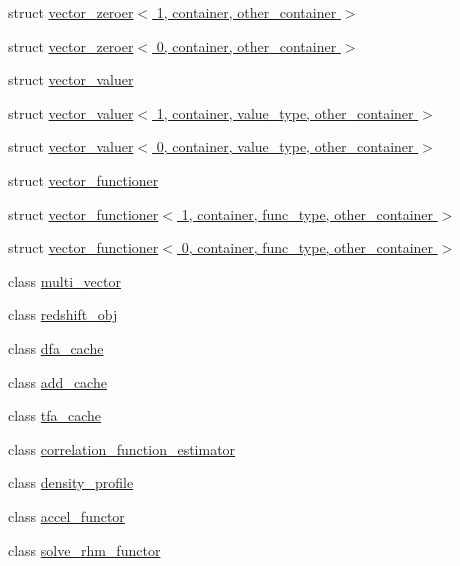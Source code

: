 \begin{DoxyCompactItemize}
struct \hyperlink{structIceBRG_1_1vector__zeroer_3_011_00_01container_00_01other__container_01_4}{vector\-\_\-zeroer$<$ 1, container, other\-\_\-container $>$}
\item 
struct \hyperlink{structIceBRG_1_1vector__zeroer_3_010_00_01container_00_01other__container_01_4}{vector\-\_\-zeroer$<$ 0, container, other\-\_\-container $>$}
\item 
struct \hyperlink{structIceBRG_1_1vector__valuer}{vector\-\_\-valuer}
\item 
struct \hyperlink{structIceBRG_1_1vector__valuer_3_011_00_01container_00_01value__type_00_01other__container_01_4}{vector\-\_\-valuer$<$ 1, container, value\-\_\-type, other\-\_\-container $>$}
\item 
struct \hyperlink{structIceBRG_1_1vector__valuer_3_010_00_01container_00_01value__type_00_01other__container_01_4}{vector\-\_\-valuer$<$ 0, container, value\-\_\-type, other\-\_\-container $>$}
\item 
struct \hyperlink{structIceBRG_1_1vector__functioner}{vector\-\_\-functioner}
\item 
struct \hyperlink{structIceBRG_1_1vector__functioner_3_011_00_01container_00_01func__type_00_01other__container_01_4}{vector\-\_\-functioner$<$ 1, container, func\-\_\-type, other\-\_\-container $>$}
\item 
struct \hyperlink{structIceBRG_1_1vector__functioner_3_010_00_01container_00_01func__type_00_01other__container_01_4}{vector\-\_\-functioner$<$ 0, container, func\-\_\-type, other\-\_\-container $>$}
\item 
class \hyperlink{classIceBRG_1_1multi__vector}{multi\-\_\-vector}
\item 
class \hyperlink{classIceBRG_1_1redshift__obj}{redshift\-\_\-obj}
\item 
class \hyperlink{classIceBRG_1_1dfa__cache}{dfa\-\_\-cache}
\item 
class \hyperlink{classIceBRG_1_1add__cache}{add\-\_\-cache}
\item 
class \hyperlink{classIceBRG_1_1tfa__cache}{tfa\-\_\-cache}
\item 
class \hyperlink{classIceBRG_1_1correlation__function__estimator}{correlation\-\_\-function\-\_\-estimator}
\item 
class \hyperlink{classIceBRG_1_1density__profile}{density\-\_\-profile}
\item 
class \hyperlink{classIceBRG_1_1accel__functor}{accel\-\_\-functor}
\item 
class \hyperlink{classIceBRG_1_1solve__rhm__functor}{solve\-\_\-rhm\-\_\-functor}

\end{DoxyCompactItemize}
